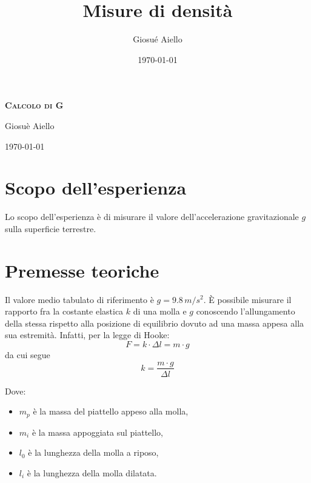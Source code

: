 \documentclass{article}
\title{\Huge{Misure di densità}}
\author{\large{Giosué Aiello}}
\date{\today}
\begin{document}
	\begin{titlingpage}
    \begin{center}
        \vspace*{60pt} %

        {\Huge \textbf{\textsc{Calcolo di G}}} %
        \vspace{30pt} %

        {\huge{Giosuè Aiello}} %
        \vspace{20pt} %

        {\large \today} %
    \end{center}
    
    \vfill %
\end{titlingpage}

\pagebreak
    \section{Scopo dell'esperienza}
    Lo scopo dell'esperienza è di misurare il valore dell’accelerazione gravitazionale $g$ sulla superficie terrestre. 
     
    
 \section{Premesse teoriche}    
    Il valore medio tabulato di riferimento è $g = 9.8 \, m/s^2$. È possibile misurare il rapporto fra la costante elastica $k$ di una molla e $g$ conoscendo l’allungamento della stessa rispetto alla posizione di equilibrio dovuto ad una massa appesa alla sua estremità. Infatti, per la legge di Hooke:
    \[
    F = k \cdot \Delta l = m \cdot g
    \]
    da cui segue
    \[
    k = \frac{m \cdot g}{\Delta l}
    \]

    Dove:
    \begin{itemize}
        \item $m_p$ è la massa del piattello appeso alla molla,
        \item $m_i$ è la massa appoggiata sul piattello,
        \item $l_0$ è la lunghezza della molla a riposo,
        \item $l_i$ è la lunghezza della molla dilatata.
    \end{itemize}
\end{document}
